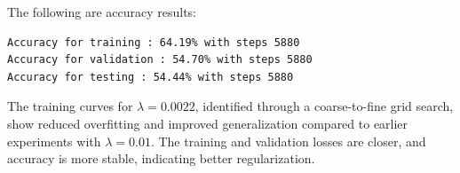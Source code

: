 \documentclass[11pt]{article}
\begin{document}
The following are accuracy results:
\begin{lstlisting}[caption={Training and validation accuracy for best lambda}, label={lst:best_lambda_accuracy}]
Accuracy for training : 64.19% with steps 5880
Accuracy for validation : 54.70% with steps 5880
Accuracy for testing : 54.44% with steps 5880
\end{lstlisting}

The training curves for \( \lambda = 0.0022 \), identified through a coarse-to-fine grid search, show reduced overfitting and improved generalization compared to earlier experiments with \(\lambda = 0.01 \).
The training and validation losses are closer, and accuracy is more stable, indicating better regularization.
\end{document}
